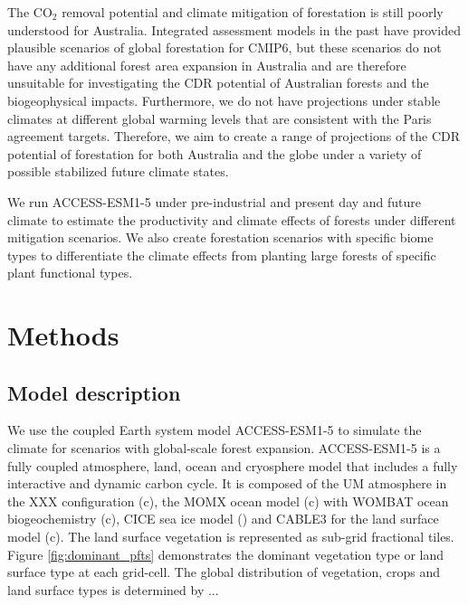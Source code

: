 \documentclass[]{article}
\begin{document}
The CO$_2$ removal potential and climate mitigation of forestation is still poorly understood for Australia.
Integrated assessment models in the past have provided plausible scenarios of global forestation for CMIP6, but these scenarios do not have any additional forest area expansion in Australia \parencite{loughran_limited_2023} and are therefore unsuitable for investigating the CDR potential of Australian forests and the biogeophysical impacts.
Furthermore, we do not have projections under stable climates at different global warming levels that are consistent with the Paris agreement targets.
Therefore, we aim to create a range of projections of the CDR potential of forestation for both Australia and the globe under a variety of possible stabilized future climate states.

We run ACCESS-ESM1-5 under pre-industrial and present day and future climate to estimate the productivity and climate effects of forests under different mitigation scenarios.
We also create forestation scenarios with specific biome types to differentiate the climate effects from planting large forests of specific plant functional types.

\section{Methods}

\subsection{Model description}

We use the coupled Earth system model ACCESS-ESM1-5 to simulate the climate for scenarios with global-scale forest expansion.
ACCESS-ESM1-5 is a fully coupled atmosphere, land, ocean and cryosphere model that includes a fully interactive and dynamic carbon cycle.
It is composed of the UM atmosphere in the XXX configuration (c), the MOMX ocean model (c) with WOMBAT ocean biogeochemistry (c), CICE sea ice model () and CABLE3 for the land surface model (c).
The land surface vegetation is represented as sub-grid fractional tiles.
Figure \ref{fig:dominant_pfts} demonstrates the dominant vegetation type or land surface type at each grid-cell.
The global distribution of vegetation, crops and land surface types is determined by ...
\end{document}
